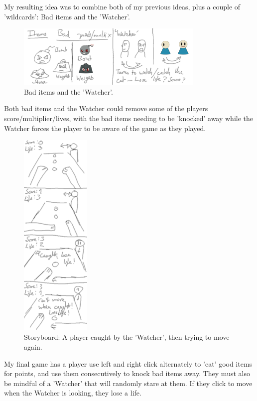 \documentclass{article}
\begin{document}
My resulting idea was to combine both of my previous ideas, plus a couple of 'wildcards': Bad items and the 'Watcher'.
\begin{figure}[H]
  \centering
    \includegraphics[width=0.8\textwidth]{img/storyboard/original_bad}
  \caption{Bad items and the 'Watcher'.}
\end{figure}
 Both bad items and the Watcher could remove some of the players score/multiplier/lives, with the bad items needing to be 'knocked' away while the Watcher forces the player to be aware of the game as they played. 
\begin{figure}[H]
  \centering
    \includegraphics[width=0.3\textwidth]{img/storyboard/original_watcher.png}
  \caption{Storyboard: A player caught by the 'Watcher', then trying to move again.}
\end{figure}

My final game has a player use left and right click alternately to 'eat' good items for points, and use them consecutively to knock bad items away. They must also be mindful of a 'Watcher' that will randomly stare at them. If they click to move when the Watcher is looking, they lose a life.
\end{document}
